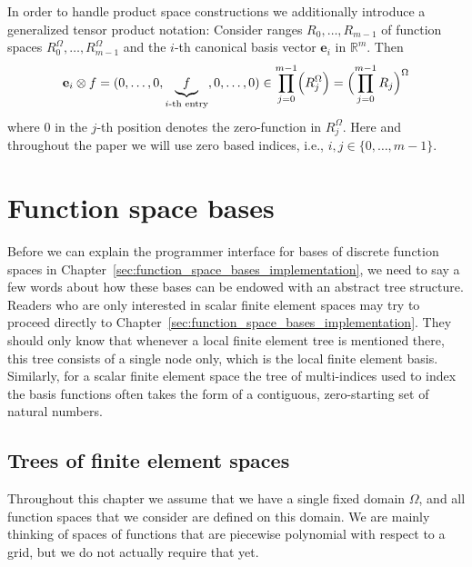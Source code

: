 \documentclass[a4paper,10pt,headings=normal,bibliography=totoc]{scrartcl}
\newcommand{\R}{\mathbb{R}}
\begin{document}
In order to handle product space constructions we additionally introduce
a generalized tensor product notation:
Consider ranges $R_0,\dots,R_{m-1}$ of function spaces $R_0^\Omega,\dots,R_{m-1}^\Omega$
and the $i$-th canonical basis vector $\mathbf{e}_i$ in $\R^m$.
Then
\begin{align*}
  \mathbf{e}_i \otimes f
  = (0,\dots,0,\underbrace{f}_{\text{$i$-th entry}},0,\dots,0)
  \in \prod_{j=0}^{m-1} \Bigl(R_j^\Omega\Bigr) = \Bigl(\prod_{j=0}^{m-1} R_j\Bigr)^\Omega
\end{align*}
where $0$ in the $j$-th position denotes the zero-function in $R_j^\Omega$.
Here and throughout the paper we will use zero based indices, i.e., $i,j\in \{0,\dots,m-1\}$.


\label{sec:notation}

\section{Function space bases}
\label{sec:finite_element_trees}


Before we can explain the programmer interface for bases of discrete function spaces in Chapter~\ref{sec:function_space_bases_implementation},
we need to say a few words about how these bases can be endowed with an abstract tree structure.
Readers who are only interested in scalar finite element spaces may try to proceed directly to
Chapter~\ref{sec:function_space_bases_implementation}.  They should only know that whenever a
local finite element tree
is mentioned there, this tree consists of a single node only, which is the local finite element basis.
Similarly, for a scalar finite element space the tree of multi-indices used to index the
basis functions often takes the form of
a contiguous, zero-starting set of natural numbers.

\subsection{Trees of finite element spaces}

Throughout this chapter we assume that we have a single fixed domain $\Omega$, and all function spaces
that we consider are defined on this domain.  We are mainly thinking of spaces of functions that are
piecewise polynomial with respect to a grid, but we do not actually require that yet.
\end{document}
